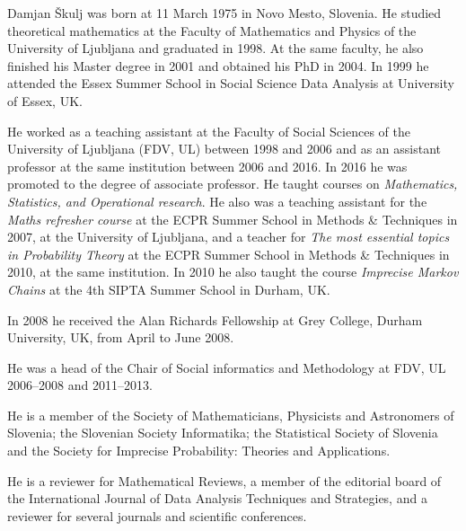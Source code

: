 \documentclass[overlapped,line,letterpaper]{res}
\begin{document}
	
	
	\setlength{\leftmargini}{0em}
	\renewcommand{\labelitemi}{}
	
	\renewcommand{\namefont}{\large\textbf}
	
	
	
	
	
	\begin{resume}
		Damjan \v{S}kulj was born at 11 March 1975 in Novo Mesto, Slovenia. He studied theoretical mathematics at the Faculty of Mathematics and Physics of the University of Ljubljana and graduated in 1998. At the same faculty, he also finished his Master degree in 2001 and obtained his PhD in 2004. In 1999 he attended the Essex Summer School in Social Science Data Analysis at University of Essex, UK. 
		
		He worked as a teaching assistant at the Faculty of Social Sciences of the University of Ljubljana (FDV, UL) between 1998 and 2006 and as an assistant professor at the same institution between 2006 and 2016. In 2016 he was promoted to the degree of associate professor. He taught courses on \textit{Mathematics, Statistics, and Operational research}. He also was a teaching assistant for the {\em Maths refresher course} at the ECPR Summer School in Methods \& Techniques in 2007, at the University of Ljubljana, and a teacher for {\em The most essential topics in Probability Theory} at the ECPR Summer School in Methods \& Techniques in 2010, at the same institution. In 2010 he also taught the course {\em Imprecise Markov Chains} at the 4th SIPTA Summer School in Durham, UK. 
		
		In 2008 he received the Alan Richards Fellowship at Grey College, Durham University, UK, from April to June 2008.
		
		He was a head of the Chair of Social informatics and Methodology at FDV, UL 2006--2008 and 2011--2013. 
		
		He is a member of the Society of Mathematicians, Physicists and Astronomers of Slovenia; the Slovenian Society Informatika; the Statistical Society of Slovenia and the Society for Imprecise Probability: Theories and Applications. 
		
		He is a reviewer for Mathematical Reviews, a member of the editorial board of the International Journal of Data Analysis Techniques and Strategies, and a reviewer for several journals and scientific conferences.
		

\end{resume}
\end{document}
